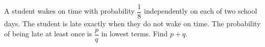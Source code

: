 A student wakes on time with probability $\dfrac{1}{8}$ independently on each of two school days. The student is late exactly when they do not wake on time. The probability of being late at least once is $\dfrac{p}{q}$ in lowest terms. Find $p+q$.
